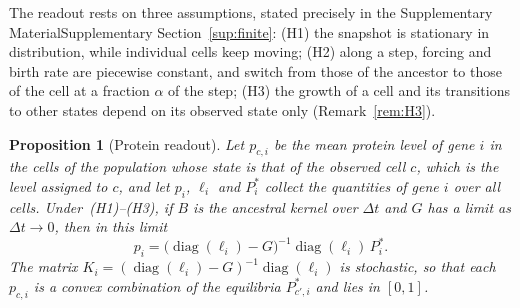 \documentclass[a4paper, 11pt]{article}
\DeclareMathOperator{\diag}{diag}
\newcommand{\supref}[1]{\ifsimplified the Supplementary Material\else Supplementary Section~\ref{#1}\fi}
\theoremstyle{plain}
\newtheorem{prop}{Proposition}
\theoremstyle{remark}
\begin{document}
The readout rests on three assumptions, stated precisely in \supref{sup:finite}: (H1) the snapshot is stationary in distribution, while individual cells keep moving; (H2) along a step, forcing and birth rate are piecewise constant, and switch from those of the ancestor to those of the cell at a fraction $\alpha$ of the step; (H3) the growth of a cell and its transitions to other states depend on its observed state only (Remark~\ref{rem:H3}).

\begin{prop}[Protein readout]\label{prop:readout}
Let $p_{c,i}$ be the mean protein level of gene $i$ in the cells of the population whose state is that of the observed cell $c$, which is the level assigned to $c$, and let $p_i$, $\ell_i$ and $P^\ast_i$ collect the quantities of gene $i$ over all cells. Under~(H1)--(H3), if $B$ is the ancestral kernel over $\Delta t$ and $G$ has a limit as $\Delta t \to 0$, then in this limit
\begin{equation}\label{eq:readout}
p_i = \bigl(\diag(\ell_i) - G\bigr)^{-1}\diag(\ell_i)\,P^\ast_i .
\end{equation}
The matrix $K_i = (\diag(\ell_i) - G)^{-1}\diag(\ell_i)$ is stochastic, so that each $p_{c,i}$ is a convex combination of the equilibria $P^\ast_{c',i}$ and lies in $[0,1]$.
\end{prop}
\end{document}

